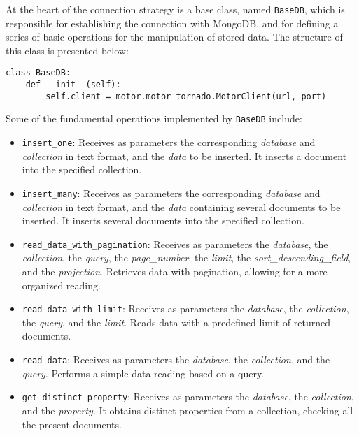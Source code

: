At the heart of the connection strategy is a base class, named \texttt{BaseDB}, which is responsible for establishing the connection with MongoDB, and for defining a series of basic operations for the manipulation of stored data. The structure of this class is presented below:

\begin{Verbatim}[fontsize=\small, baselinestretch=0.6]
class BaseDB:
    def __init__(self):
        self.client = motor.motor_tornado.MotorClient(url, port)
\end{Verbatim}

Some of the fundamental operations implemented by \texttt{BaseDB} include:

\begin{itemize}
    \item \texttt{insert\_one}: Receives as parameters the corresponding \textit{database} and \textit{collection} in text format, and the \textit{data} to be inserted. It inserts a document into the specified collection.
    
    \item \texttt{insert\_many}: Receives as parameters the corresponding \textit{database} and \textit{collection} in text format, and the \textit{data} containing several documents to be inserted. It inserts several documents into the specified collection.

    \item \texttt{read\_data\_with\_pagination}: Receives as parameters the \textit{database}, the \textit{collection}, the \textit{query}, the \textit{page\_number}, the \textit{limit}, the \textit{sort\_descending\_field}, and the \textit{projection}. Retrieves data with pagination, allowing for a more organized reading.
    
    \item \texttt{read\_data\_with\_limit}: Receives as parameters the \textit{database}, the \textit{collection}, the \textit{query}, and the \textit{limit}. Reads data with a predefined limit of returned documents.
    
    \item \texttt{read\_data}: Receives as parameters the \textit{database}, the \textit{collection}, and the \textit{query}. Performs a simple data reading based on a query.
    
    \item \texttt{get\_distinct\_property}: Receives as parameters the \textit{database}, the \textit{collection}, and the \textit{property}. It obtains distinct properties from a collection, checking all the present documents.
    

\end{itemize}

